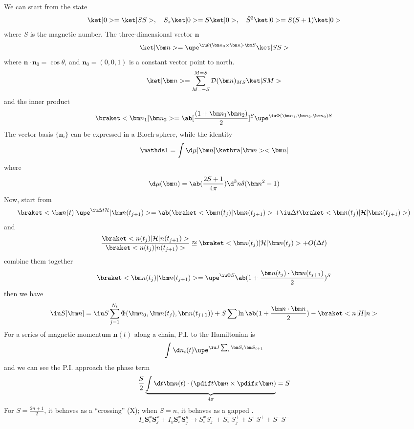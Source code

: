 We can start from the state
\begin{equation}
  \ket|0> = \ket|SS>, \quad
  S_z\ket|0> = S\ket|0>, \quad
  \hat S^2 \ket|0> = S(S + 1) \ket|0>
\end{equation}
where $S$ is the magnetic number.
The three-dimensional vector $\bm n$
\begin{equation}
  \ket|\bm n> = \upe^{\iu\theta(\bm n_0\times\bm n) \cdot \bm S} \ket|SS>
\end{equation}
where $\bm n \cdot \bm n_0 = \cos\theta$, and $\bm n_0 = (0, 0, 1)$ is a constant vector point to north.
\begin{equation}
  \ket|\bm n> = \sum_{M=-S}^{M=S} \mathcal D(\bm n)_{MS} \ket|SM>
\end{equation}
and the inner product
\begin{equation}
  \braket<\bm n_1|\bm n_2> = \ab[\frac{(1 + \bm n_1 \bm n_2)}2]^S
  \upe^{\iu\Phi(\bm n_1, \bm n_2, \bm n_0)S}
\end{equation}
The vector basis $\{\bm n_i\}$ can be expressed in a Bloch-sphere,
while the identity
\begin{equation}
  \identity = \int \d\mu[\bm n] \ketbra|\bm n><\bm n|
\end{equation}
where
\begin{equation}
  \d \mu(\bm n) = \ab(\frac{2S + 1}{4\pi}) \d^3n \delta(\bm n^2 - 1)
\end{equation}
Now, start from
\[
  \braket<\bm n(t)|\upe^{\iu\Delta t\mathcal H}|\bm n(t_{j+1})>
= \ab(\braket<\bm n(t_j)|\bm n(t_{j+1})>
  + \iu\Delta t\braket<\bm n(t_j)|\mathcal H|\bm n(t_{j+1})>)
\]
and
\[
  \frac{\braket<n(t_j)|\mathcal H|n(t_{j+1})>}{\braket<n(t_j)|n(t_{j+1})>}
  \approxeq \braket<\bm n(t_j)|\mathcal H|\bm n(t_j)> + O(\Delta t)
\]
combine them together
\begin{equation}
  \braket<\bm n(t_j)|\bm n(t_{j+1})> = \upe^{\iu\Phi S}\ab(1 + \frac{\bm n(t_j) \cdot \bm n(t_{j+1})}2)^S
\end{equation}
then we have
\begin{equation}
  \iu S[\bm n] = \iu S \sum_{j=1}^{N_t} \Phi(\bm n_0, \bm n(t_j), \bm n(t_{j+1}))
+ S \sum \ln\ab(1 + \frac{\bm n \cdot \bm n}2) - \braket<n|H|n>
\end{equation}
For a series of magnetic momentum $\bm n(t)$ along a chain,
P.I. to the Hamiltonian is
\[
  \int \d n_i(t) \upe^{\iu J\sum_i \bm S_i \bm S_{i+1}}
\]
and we can see the P.I. approach the phase term
\[
  \frac S2 \underbrace{\int \d t \bm n(t) \cdot (\pdif t \bm n \times \pdif x \bm n)}_{4\pi} = S
\]
For $S = \frac{2n + 1}{2}$, it behaves as a ``crossing'' (X);
when $S = n$, it behaves as a gapped .
\[
  I_x \bm S_i^x \bm S_j^x + I_y \bm S_i^x \bm S_j^y
  \longrightarrow S_i^x S_j^- + S_i^- S_j^+ + S^+ S^+ + S^-S^-
\]

